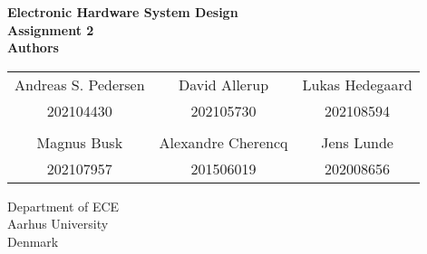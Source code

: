 \documentclass[../main.tex]{subfiles}
\begin{document}
\thispagestyle{empty}

\begin{titlepage}
    \begin{center}
        \vspace*{20pt}
        \textbf{\huge{Electronic Hardware System Design}} \\
        \vspace*{20pt}
        \textbf{\large{Assignment 2}} \\
        \vspace*{50pt}
        \textbf{\Large{Authors}} \\
        \vspace{20pt}
        \begin{tabular}{c c c}
            Andreas S. Pedersen & David Allerup & Lukas Hedegaard \\
            202104430 & 202105730 & 202108594 \\
             && \\
            Magnus Busk & Alexandre Cherencq & Jens Lunde \\
            202107957 & 201506019 & 202008656 \\
        \end{tabular}

        \vfill
        \vspace*{3cm}
        Department of ECE\\
        Aarhus University\\
        Denmark
    \end{center}
\end{titlepage}
\end{document}
